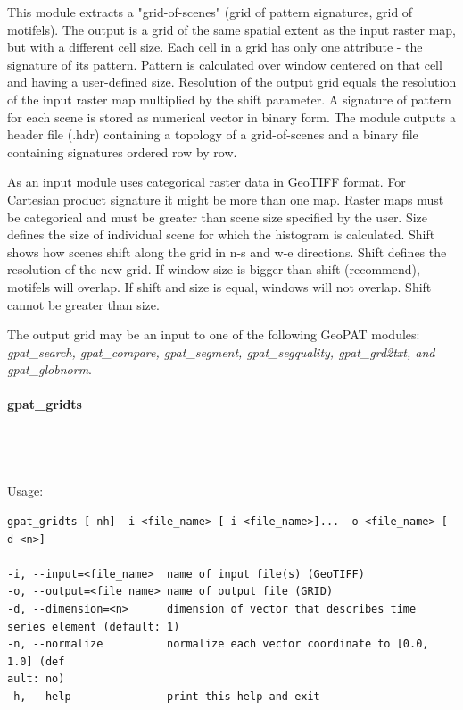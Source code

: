 \documentclass[12pt,margin=0.5in]{article}
\newcommand{\newparagraph}[1]{\paragraph{#1}\mbox{}\\}
\begin{document}
This module extracts a "grid-of-scenes" (grid of pattern signatures, grid of motifels). The output is a grid of the same spatial extent as the input raster map, but with a different cell size. Each cell in a grid has only one attribute - the signature of its pattern. Pattern is calculated over window centered on that cell and having a user-defined size. Resolution of the output grid equals the resolution of the input raster map multiplied by the shift parameter. A signature of pattern for each scene is stored as numerical vector in binary form. The module outputs a header file (.hdr) containing a topology of a grid-of-scenes and a binary file containing signatures ordered row by row.

As an input module uses categorical raster data in GeoTIFF format. For Cartesian product signature it might be more than one map. Raster maps must be categorical and must be greater than scene size specified by the user. Size defines the size of individual scene for which the histogram is calculated. Shift shows how scenes shift along the grid in n-s and w-e directions. Shift defines the resolution of the new grid. If window size is bigger than shift (recommend), motifels will overlap. If shift and size is equal, windows will not overlap. Shift cannot be greater than size. 

The output grid may be an input to one of the following GeoPAT modules: {\it gpat\_search, gpat\_compare, gpat\_segment, gpat\_segquality, gpat\_grd2txt, and gpat\_globnorm}.

\newparagraph{gpat\_gridts}
{}
\\\\
Usage:
\begin{lstlisting}[frame=single]
gpat_gridts [-nh] -i <file_name> [-i <file_name>]... -o <file_name> [-d <n>]

-i, --input=<file_name>  name of input file(s) (GeoTIFF)
-o, --output=<file_name> name of output file (GRID)
-d, --dimension=<n>      dimension of vector that describes time series element (default: 1)
-n, --normalize          normalize each vector coordinate to [0.0, 1.0] (def
ault: no)
-h, --help               print this help and exit
\end{lstlisting}
\end{document}
